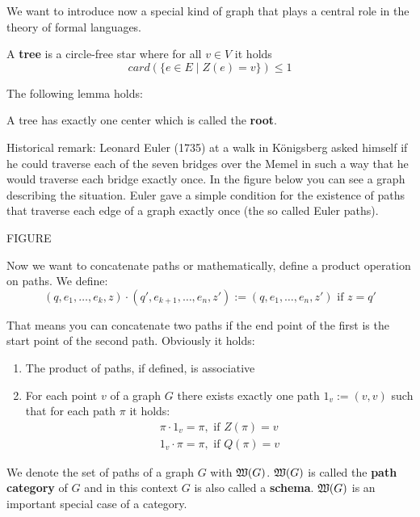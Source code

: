 We want to introduce now a special kind of graph that plays a central role in
the theory of formal languages.

\begin{definition}
A {\bf tree} is a circle-free star where for all $v \in V$ it holds
\[ card(\{ e \in E \mid Z(e) = v \}) \leq 1 \]
\end{definition}

The following lemma holds:
\begin{lemma}
A tree has exactly one center which is called the {\bf root}.
\end{lemma}

Historical remark: Leonard Euler (1735) at a walk in Königsberg asked himself if
he could traverse each of the seven bridges over the Memel in such
a way that he would traverse each bridge exactly once. In the figure below you
can see a graph describing the situation. Euler gave a simple condition for the
existence of paths that traverse each edge of a graph exactly once (the so
called Euler paths).

FIGURE

Now we want to concatenate paths or mathematically, define a product operation
on paths. We define:
\[ (q, e_1, \ldots, e_k, z) \cdot (q', e_{k+1}, \ldots, e_n, z') := (q, e_1,
\ldots, e_n, z')\text{ if } z = q' \]

That means you can concatenate two paths if the end point of the first is the
start point of the second path. Obviously it holds:
\begin{enumerate}
  \item The product of paths, if defined, is associative
  \item For each point $v$ of a graph $G$ there exists exactly one path $1_v :=
  (v, v)$ such that for each path $\pi$ it holds:
  	\begin{eqnarray*}
    	\pi \cdot 1_v = \pi,\text{ if }Z(\pi) = v \\
    	1_v \cdot \pi = \pi,\text{ if }Q(\pi) = v
  	\end{eqnarray*}
\end{enumerate}

We denote the set of paths of a graph $G$ with $\mbox{$\mathfrak{W}(G)$}$. $\mbox{$\mathfrak{W}(G)$}$ is called the 
{\bf path category} of $G$ and in this context $G$ is also called a {\bf
schema}. $\mbox{$\mathfrak{W}(G)$}$ is an important special case of a category.


